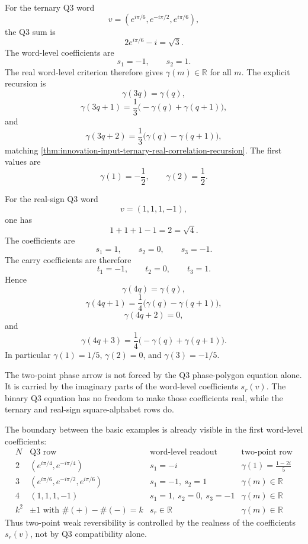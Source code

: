 \begin{principle}
\label{prin:innovation-input-ternary-weakly-reversible-word}
For the ternary Q3 word
$$
v=(e^{i\pi/6},e^{-i\pi/2},e^{i\pi/6}),
$$
the Q3 sum is
$$
2e^{i\pi/6}-i=\sqrt3.
$$
The word-level coefficients are
$$
s_1=-1,
\qquad
s_2=1.
$$
The real word-level criterion therefore gives
$\gamma(m)\in\mathbb R$ for all $m$. The explicit recursion is
$$
\gamma(3q)=\gamma(q),
$$
$$
\gamma(3q+1)=\frac13\bigl(-\gamma(q)+\gamma(q+1)\bigr),
$$
and
$$
\gamma(3q+2)=\frac13\bigl(\gamma(q)-\gamma(q+1)\bigr),
$$
matching
\autoref{thm:innovation-input-ternary-real-correlation-recursion}. The
first values are
$$
\gamma(1)=-\frac12,
\qquad
\gamma(2)=\frac12.
$$
\end{principle}

\begin{principle}
\label{prin:innovation-input-quartic-real-sign-word}
For the real-sign Q3 word
$$
v=(1,1,1,-1),
$$
one has
$$
1+1+1-1=2=\sqrt4.
$$
The coefficients are
$$
s_1=1,
\qquad
s_2=0,
\qquad
s_3=-1.
$$
The carry coefficients are therefore
$$
t_1=-1,
\qquad
t_2=0,
\qquad
t_3=1.
$$
Hence
$$
\gamma(4q)=\gamma(q),
$$
$$
\gamma(4q+1)=\frac14\bigl(\gamma(q)-\gamma(q+1)\bigr),
$$
$$
\gamma(4q+2)=0,
$$
and
$$
\gamma(4q+3)=\frac14\bigl(-\gamma(q)+\gamma(q+1)\bigr).
$$
In particular $\gamma(1)=1/5$, $\gamma(2)=0$, and $\gamma(3)=-1/5$.
\end{principle}

\begin{principle}
\label{prin:innovation-input-two-point-arrow-location}
The two-point phase arrow is not forced by the Q3 phase-polygon equation
alone. It is carried by the imaginary parts of the word-level coefficients
$s_r(v)$. The binary Q3 equation has no freedom to make those coefficients
real, while the ternary and real-sign square-alphabet rows do.
\end{principle}

\begin{principle}
\label{prin:innovation-input-coefficient-readout}
The boundary between the basic examples is already visible in the first
word-level coefficients:
$$
\begin{array}{c|c|c|c}
N & \text{Q3 row} & \text{word-level readout} & \text{two-point row}\\
\hline
2 & (e^{i\pi/4},e^{-i\pi/4}) &
s_1=-i &
\gamma(1)=\frac{1-2i}{5}\\
3 & (e^{i\pi/6},e^{-i\pi/2},e^{i\pi/6}) &
s_1=-1,\ s_2=1 &
\gamma(m)\in\mathbb R\\
4 & (1,1,1,-1) &
s_1=1,\ s_2=0,\ s_3=-1 &
\gamma(m)\in\mathbb R\\
k^2 & \pm1\text{ with } \#(+)-\#(-)=k &
s_r\in\mathbb R &
\gamma(m)\in\mathbb R
\end{array}
$$
Thus two-point weak reversibility is controlled by the realness of the
coefficients $s_r(v)$, not by Q3 compatibility alone.
\end{principle}

